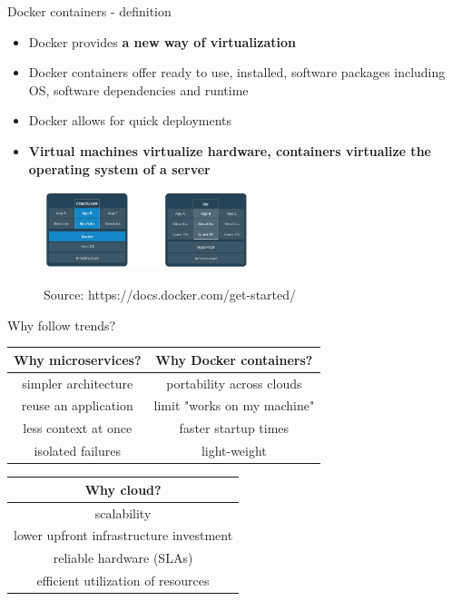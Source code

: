 \documentclass{beamer}
\newcommand{\source}[1]{\caption*{Source: {#1}} }
\begin{document}
\begin{frame}{Docker containers - definition}%
\begin{itemize}
\item Docker provides \textbf{a new way of virtualization}
\item Docker containers offer ready to use, installed, software packages including OS, software dependencies and runtime
\item Docker allows for quick deployments
\item \textbf{Virtual machines virtualize hardware, containers virtualize the operating system of a server}
\end{itemize}
\begin{figure}
	\includegraphics[width=6cm]{figures/docker-vs-vms.png}
	\label{fig:docker-vs-vms}
	\source{https://docs.docker.com/get-started/}
\end{figure}
\end{frame}

\begin{frame}{Why follow trends?}%
\begin{center}
	\begin{tabular}{ | c | c |}
		\hline
		{\bfseries Why microservices?} & {\bfseries Why Docker containers?} \\ \hline
		simpler architecture & portability across clouds \\ \hline
		reuse an application & limit "works on my machine" \\ \hline
		less context at once & faster startup times \\ \hline
		isolated failures &  light-weight \\ 
		\hline
	\end{tabular}
	\begin{tabular}{ | c |}
		\hline
		 {\bfseries Why cloud?} \\ \hline
		 scalability \\ \hline
		 lower upfront infrastructure investment \\ \hline
		 reliable hardware (SLAs) \\ \hline
		 efficient utilization of resources \\ 
		\hline
	\end{tabular}
\end{center}
\end{frame}
\end{document}
